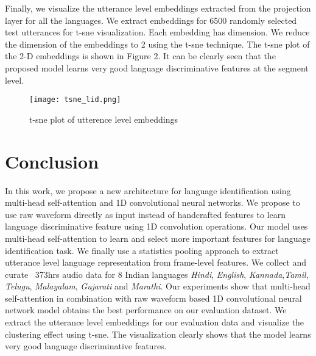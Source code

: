 \documentclass{article}
\begin{document}
Finally, we visualize the utterance level embeddings extracted from the projection layer for all the languages. We extract embeddings for 6500 randomly selected test utterances for t-sne visualization. Each embedding has dimension. We reduce the dimension of the embeddings to 2 using the t-sne technique. The t-sne plot of the 2-D embeddings is shown in Figure 2.  It can be clearly seen that the proposed model learns very good language discriminative features at the segment level.

\begin{figure}[t]
  \centering
  \texttt{[image: tsne\_lid.png]}
  \caption{t-sne plot of utterence level embeddings}
  \label{fig:speech_production}
\end{figure}

\section{Conclusion}
\label{sec:foot}
In this work, we propose a new architecture for language identification using multi-head self-attention and 1D convolutional neural networks. We propose to use raw waveform directly as input instead of handcrafted features to learn language discriminative feature using 1D convolution operations. Our model uses multi-head self-attention to learn and select more important features for language identification task.  We finally use a statistics pooling approach to extract utterance level language representation from frame-level features. We collect and curate ~373hrs audio data for 8 Indian languages \textit{Hindi}, \textit{English}, \textit{Kannada},\textit{Tamil}, \textit{Telugu}, \textit{Malayalam}, \textit{Gujarati} and \textit{Marathi}. Our experiments show that multi-head self-attention in combination with raw waveform based 1D convolutional neural network model obtains the best performance on our evaluation dataset. We extract the utterance level embeddings for our evaluation data and visualize the clustering effect using t-sne. The visualization clearly shows that the model learns very good language discriminative features.
\end{document}
